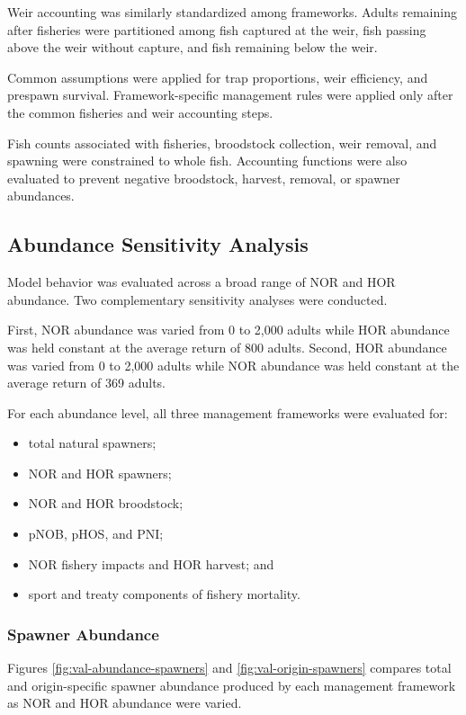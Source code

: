 \documentclass[12pt,letterpaper]{article}
\providecommand{\tightlist}{%
  \setlength{\itemsep}{0pt}\setlength{\parskip}{0pt}}
\begin{document}
Weir accounting was similarly standardized among frameworks. Adults remaining
after fisheries were partitioned among fish captured at the weir, fish passing
above the weir without capture, and fish remaining below the weir.

Common assumptions were applied for trap proportions, weir efficiency, and
prespawn survival. Framework-specific management rules were applied only after
the common fisheries and weir accounting steps.

Fish counts associated with fisheries, broodstock collection, weir removal,
and spawning were constrained to whole fish. Accounting functions were also
evaluated to prevent negative broodstock, harvest, removal, or spawner
abundances.

\subsection{Abundance Sensitivity Analysis}\label{abundance-sensitivity-analysis}

Model behavior was evaluated across a broad range of NOR and HOR abundance.
Two complementary sensitivity analyses were conducted.

First, NOR abundance was varied from 0 to 2,000 adults while HOR abundance was
held constant at the average return of 800 adults. Second, HOR abundance was varied from 0 to 2,000 adults while NOR abundance was held constant at the average return of 369 adults.

For each abundance level, all three management frameworks were evaluated for:

\begin{itemize}
\tightlist
\item
  total natural spawners;
\item
  NOR and HOR spawners;
\item
  NOR and HOR broodstock;
\item
  pNOB, pHOS, and PNI;
\item
  NOR fishery impacts and HOR harvest; and
\item
  sport and treaty components of fishery mortality.
\end{itemize}

\subsubsection{Spawner Abundance}\label{spawner-abundance}

Figures \ref{fig:val-abundance-spawners} and \ref{fig:val-origin-spawners} compares total and origin-specific spawner abundance produced by each management framework as NOR and HOR abundance were varied.
\end{document}
